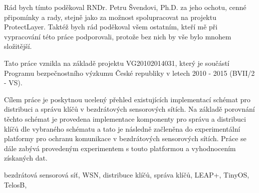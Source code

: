 \documentclass[11pt,final,twoside]{fithesis2}
\begin{document}
\FrontMatter
\ThesisTitlePage

\begin{ThesisDeclaration}
  \DeclarationText
  \AdvisorName
\end{ThesisDeclaration}

\begin{ThesisThanks}
Rád bych tímto poděkoval RNDr. Petru Švendovi, Ph.D. za jeho ochotu, cenné připomínky a rady, stejně jako za možnost spolupracovat na projektu ProtectLayer. 
Taktéž bych rád poděkoval všem ostatním, kteří mě při vypracování této práce podporovali, protože bez nich by vše bylo mnohem složitější. 

\bigskip
\bigskip
\bigskip
\bigskip
Tato práce vznikla na základě projektu VG20102014031, který je součástí
Programu bezpečnostního výzkumu České republiky v letech 2010 - 2015
(BVII/2 - VS).
\end{ThesisThanks}

\begin{ThesisAbstract}
Cílem práce je poskytnou ucelený přehled existujících implementací schémat pro distribuci a správu klíčů v bezdrátových sensorových sítích. Na základě porovnání těchto schémat je 
provedena implementace komponenty pro správu a distribuci klíčů dle vybraného schématu a tato je následně začleněna do experimentální platformy pro ochranu komunikace v bezdrátových sensorových sítích. 
Práce se dále zabývá provedeným experimentem s touto platformou a vyhodnocením získaných dat.

\end{ThesisAbstract}

\begin{ThesisKeyWords}
bezdrátová sensorová síť, WSN, distribuce klíčů, správa klíčů, LEAP+, TinyOS, TelosB, 
\end{ThesisKeyWords}

\MainMatter
\end{document}
